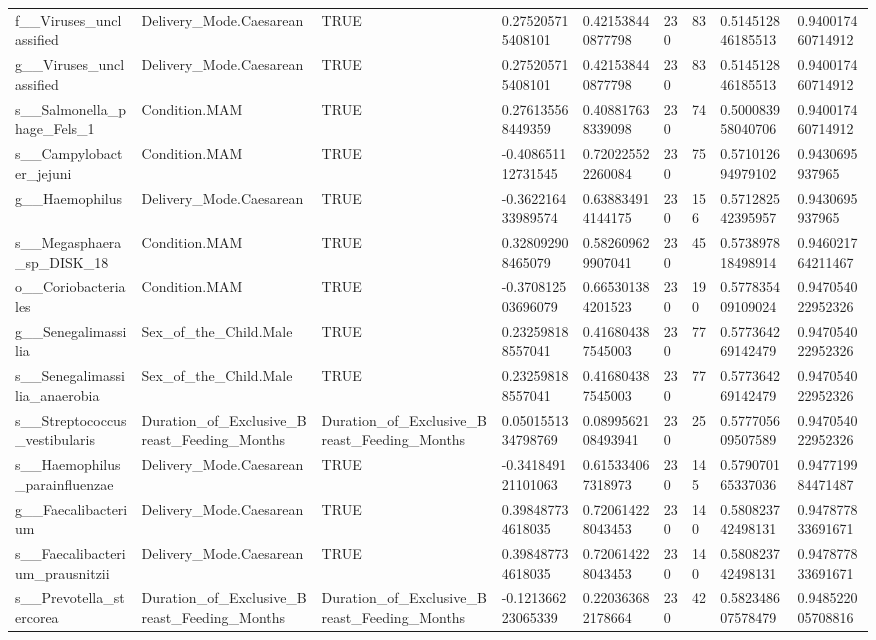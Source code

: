 \begin{longtable}{lllllllll}
f\_\_Viruses\_unclassified & Delivery\_Mode.Caesarean & TRUE & 0.275205715408101 & 0.421538440877798 & 230 & 83 & 0.514512846185513 & 0.940017460714912 \\
g\_\_Viruses\_unclassified & Delivery\_Mode.Caesarean & TRUE & 0.275205715408101 & 0.421538440877798 & 230 & 83 & 0.514512846185513 & 0.940017460714912 \\
s\_\_Salmonella\_phage\_Fels\_1 & Condition.MAM & TRUE & 0.276135568449359 & 0.408817638339098 & 230 & 74 & 0.500083958040706 & 0.940017460714912 \\
s\_\_Campylobacter\_jejuni & Condition.MAM & TRUE & -0.408651112731545 & 0.720225522260084 & 230 & 75 & 0.571012694979102 & 0.9430695937965 \\
g\_\_Haemophilus & Delivery\_Mode.Caesarean & TRUE & -0.362216433989574 & 0.638834914144175 & 230 & 156 & 0.571282542395957 & 0.9430695937965 \\
s\_\_Megasphaera\_sp\_DISK\_18 & Condition.MAM & TRUE & 0.328092908465079 & 0.582609629907041 & 230 & 45 & 0.573897818498914 & 0.946021764211467 \\
o\_\_Coriobacteriales & Condition.MAM & TRUE & -0.370812503696079 & 0.665301384201523 & 230 & 190 & 0.577835409109024 & 0.947054022952326 \\
g\_\_Senegalimassilia & Sex\_of\_the\_Child.Male & TRUE & 0.232598188557041 & 0.416804387545003 & 230 & 77 & 0.577364269142479 & 0.947054022952326 \\
s\_\_Senegalimassilia\_anaerobia & Sex\_of\_the\_Child.Male & TRUE & 0.232598188557041 & 0.416804387545003 & 230 & 77 & 0.577364269142479 & 0.947054022952326 \\
s\_\_Streptococcus\_vestibularis & Duration\_of\_Exclusive\_Breast\_Feeding\_Months & Duration\_of\_Exclusive\_Breast\_Feeding\_Months & 0.0501551334798769 & 0.0899562108493941 & 230 & 25 & 0.577705609507589 & 0.947054022952326 \\
s\_\_Haemophilus\_parainfluenzae & Delivery\_Mode.Caesarean & TRUE & -0.341849121101063 & 0.615334067318973 & 230 & 145 & 0.579070165337036 & 0.947719984471487 \\
g\_\_Faecalibacterium & Delivery\_Mode.Caesarean & TRUE & 0.398487734618035 & 0.720614228043453 & 230 & 140 & 0.580823742498131 & 0.947877833691671 \\
s\_\_Faecalibacterium\_prausnitzii & Delivery\_Mode.Caesarean & TRUE & 0.398487734618035 & 0.720614228043453 & 230 & 140 & 0.580823742498131 & 0.947877833691671 \\
s\_\_Prevotella\_stercorea & Duration\_of\_Exclusive\_Breast\_Feeding\_Months & Duration\_of\_Exclusive\_Breast\_Feeding\_Months & -0.121366223065339 & 0.220363682178664 & 230 & 42 & 0.582348607578479 & 0.948522005708816 \\

\end{longtable}
